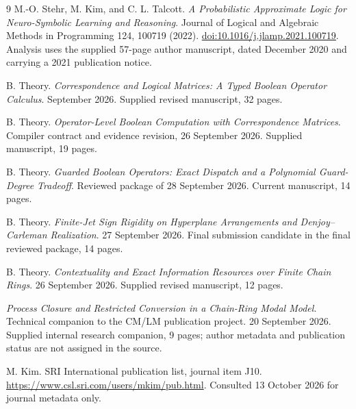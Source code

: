 \documentclass[11pt,a4paper]{article}
\theoremstyle{remark}
\begin{document}
\clearpage
{}
{}
\begin{thebibliography}{9}
M.-O. Stehr, M. Kim, and C. L. Talcott.
\emph{A Probabilistic Approximate Logic for Neuro-Symbolic Learning and Reasoning}.
Journal of Logical and Algebraic Methods in Programming 124, 100719 (2022).
\href{https://doi.org/10.1016/j.jlamp.2021.100719}{doi:10.1016/j.jlamp.2021.100719}.
Analysis uses the supplied 57-page author manuscript, dated December 2020 and carrying a 2021 publication notice.

B. Theory. \emph{Correspondence and Logical Matrices: A Typed Boolean Operator Calculus}.
September 2026. Supplied revised manuscript, 32 pages.

B. Theory. \emph{Operator-Level Boolean Computation with Correspondence Matrices}.
Compiler contract and evidence revision, 26 September 2026. Supplied manuscript, 19 pages.

B. Theory. \emph{Guarded Boolean Operators: Exact Dispatch and a Polynomial Guard-Degree Tradeoff}.
Reviewed package of 28 September 2026. Current manuscript, 14 pages.

B. Theory. \emph{Finite-Jet Sign Rigidity on Hyperplane Arrangements and Denjoy--Carleman Realization}.
27 September 2026. Final submission candidate in the final reviewed package, 14 pages.

B. Theory. \emph{Contextuality and Exact Information Resources over Finite Chain Rings}.
26 September 2026. Supplied revised manuscript, 12 pages.

\emph{Process Closure and Restricted Conversion in a Chain-Ring Modal Model}. Technical companion to the CM/LM publication project.
20 September 2026. Supplied internal research companion, 9 pages; author metadata and publication status are not assigned in the source.

M. Kim. SRI International publication list, journal item J10.
\url{https://www.csl.sri.com/users/mkim/pub.html}.
Consulted 13 October 2026 for journal metadata only.
\end{thebibliography}
\end{document}
